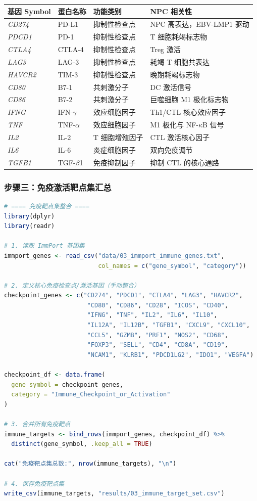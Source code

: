 \documentclass[12pt,a4paper,twoside]{article}
\newcommand{\gene}[1]{\textit{#1}}
\begin{document}
\begin{center}
\begin{tabular}{llll}
\toprule
\textbf{基因 Symbol} & \textbf{蛋白名称} & \textbf{功能类别} & \textbf{NPC 相关性} \\
\midrule
\gene{CD274} & PD-L1 & 抑制性检查点 & NPC 高表达，EBV-LMP1 驱动 \\
\gene{PDCD1} & PD-1 & 抑制性检查点 & T 细胞耗竭标志物 \\
\gene{CTLA4} & CTLA-4 & 抑制性检查点 & Treg 激活 \\
\gene{LAG3} & LAG-3 & 抑制性检查点 & 耗竭 T 细胞共表达 \\
\gene{HAVCR2} & TIM-3 & 抑制性检查点 & 晚期耗竭标志物 \\
\gene{CD80} & B7-1 & 共刺激分子 & DC 激活信号 \\
\gene{CD86} & B7-2 & 共刺激分子 & 巨噬细胞 M1 极化标志物 \\
\gene{IFNG} & IFN-$\gamma$ & 效应细胞因子 & Th1/CTL 核心效应因子 \\
\gene{TNF} & TNF-$\alpha$ & 效应细胞因子 & M1 极化与 NF-$\kappa$B 信号 \\
\gene{IL2} & IL-2 & T 细胞增殖因子 & CTL 激活核心因子 \\
\gene{IL6} & IL-6 & 炎症细胞因子 & 双向免疫调节 \\
\gene{TGFB1} & TGF-$\beta$1 & 免疫抑制因子 & 抑制 CTL 的核心通路 \\
\bottomrule
\end{tabular}
\end{center}

\subsubsection{步骤三：免疫激活靶点集汇总}

\begin{lstlisting}[language=R,caption={免疫靶点集整合代码}]
# ==== 免疫靶点集整合 ====
library(dplyr)
library(readr)

# 1. 读取 ImmPort 基因集
immport_genes <- read_csv("data/03_immport_immune_genes.txt",
                          col_names = c("gene_symbol", "category"))

# 2. 定义核心免疫检查点/激活基因（手动整合）
checkpoint_genes <- c("CD274", "PDCD1", "CTLA4", "LAG3", "HAVCR2",
                       "CD80", "CD86", "CD28", "ICOS", "CD40",
                       "IFNG", "TNF", "IL2", "IL6", "IL10",
                       "IL12A", "IL12B", "TGFB1", "CXCL9", "CXCL10",
                       "CCL5", "GZMB", "PRF1", "NOS2", "CD68",
                       "FOXP3", "SELL", "CD4", "CD8A", "CD19",
                       "NCAM1", "KLRB1", "PDCD1LG2", "IDO1", "VEGFA")

checkpoint_df <- data.frame(
  gene_symbol = checkpoint_genes,
  category = "Immune_Checkpoint_or_Activation"
)

# 3. 合并所有免疫靶点
immune_targets <- bind_rows(immport_genes, checkpoint_df) %>%
  distinct(gene_symbol, .keep_all = TRUE)

cat("免疫靶点集总数:", nrow(immune_targets), "\n")

# 4. 保存免疫靶点集
write_csv(immune_targets, "results/03_immune_target_set.csv")
\end{lstlisting}
\end{document}
